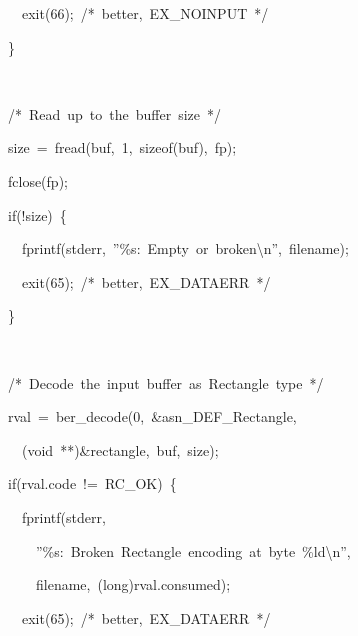\documentclass[english,oneside,12pt]{book}
\newenvironment{lyxcode}
{\par\begin{list}{}{
\setlength{\rightmargin}{\leftmargin}
\setlength{\listparindent}{0pt}%
\raggedright
\setlength{\itemsep}{0pt}
\setlength{\parsep}{0pt}
\normalfont\ttfamily}%
 \item[]}
{\end{list}}
\begin{document}
\begin{enumerate}
\begin{lyxcode}
{\small{}~~~~~~exit(66);~/{*}~better,~EX\_NOINPUT~{*}/}{\small \par}

{\small{}~~~~\}}{\small \par}

{\small{}~~}{\small \par}

{\small{}~~~~/{*}~Read~up~to~the~buffer~size~{*}/}{\small \par}

{\small{}~~~~size~=~fread(buf,~1,~sizeof(buf),~fp);}{\small \par}

{\small{}~~~~fclose(fp);}{\small \par}

{\small{}~~~~if(!size)~\{}{\small \par}

{\small{}~~~~~~fprintf(stderr,~''\%s:~Empty~or~broken\textbackslash{}n'',~filename);}{\small \par}

{\small{}~~~~~~exit(65);~/{*}~better,~EX\_DATAERR~{*}/}{\small \par}

{\small{}~~~~\}}{\small \par}

{\small{}~}{\small \par}

{\small{}~~~~/{*}~Decode~the~input~buffer~as~Rectangle~type~{*}/}{\small \par}

{\small{}~~~~rval~=~ber\_decode(0,~\&asn\_DEF\_Rectangle,}{\small \par}

{\small{}~~~~~~(void~{*}{*})\&rectangle,~buf,~size);}{\small \par}

{\small{}~~~~if(rval.code~!=~RC\_OK)~\{}{\small \par}

{\small{}~~~~~~fprintf(stderr,}{\small \par}

{\small{}~~~~~~~~''\%s:~Broken~Rectangle~encoding~at~byte~\%ld\textbackslash{}n'',}{\small \par}

{\small{}~~~~~~~~filename,~(long)rval.consumed);}{\small \par}

{\small{}~~~~~~exit(65);~/{*}~better,~EX\_DATAERR~{*}/}{\small \par}


\end{lyxcode}
\end{enumerate}
\end{document}
